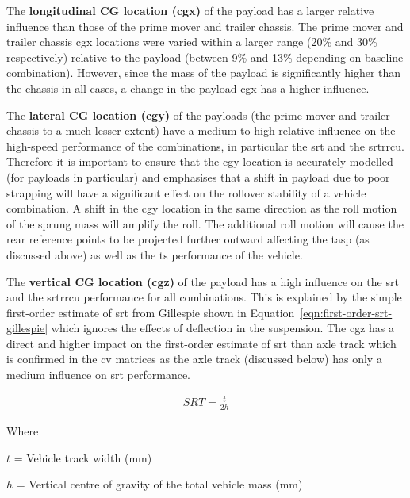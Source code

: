 The \textbf{longitudinal CG location (\gls{cgx})} of the payload has a larger relative influence than those of the prime mover and trailer chassis. The prime mover and trailer chassis \gls{cgx} locations were varied within a larger range (20\% and 30\% respectively) relative to the payload (between 9\% and 13\% depending on baseline combination). However, since the mass of the payload is significantly higher than the chassis in all cases, a change in the payload \gls{cgx} has a higher influence.

The \textbf{lateral CG location (\gls{cgy})} of the payloads (the prime mover and trailer chassis to a much lesser extent) have a medium to high relative influence on the high-speed performance of the combinations, in particular the \gls{srt} and the \gls{srtrrcu}. Therefore it is important to ensure that the \gls{cgy} location is accurately modelled (for payloads in particular) and emphasises that a shift in payload due to poor strapping will have a significant effect on the rollover stability of a vehicle combination. A shift in the \gls{cgy} location in the same direction as the roll motion of the sprung mass will amplify the roll. The additional roll motion will cause the rear reference points to be projected further outward affecting the \gls{tasp} (as discussed above) as well as the \gls{ts} performance of the vehicle.

The \textbf{vertical CG location (\gls{cgz})} of the payload has a high influence on the \gls{srt} and the \gls{srtrrcu} performance for all combinations. This is explained by the simple first-order estimate of \gls{srt} from Gillespie \cite{Gillespie1992} shown in Equation~\ref{eqn:first-order-srt-gillespie} which ignores the effects of deflection in the suspension. The \gls{cgz} has a direct and higher impact on the first-order estimate of \gls{srt} than axle track which is confirmed in the \gls{cv} matrices as the axle track (discussed below) has only a medium influence on \gls{srt} performance.

\begin{align}
	\label{eqn:first-order-srt-gillespie}
	SRT = \frac{t}{2h}
\end{align}

Where 

$t$ = Vehicle track width (mm)

$h$ = Vertical centre of gravity of the total vehicle mass (mm)


